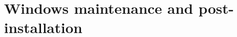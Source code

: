 \documentclass{article}
\begin{document}
\begin{comment}
  \ifnum \Status=1
      \texttt{[image: pictures/review-settings]}\hfill%
      \texttt{[image: pictures/file-copy]}
  \else
    \ifnum \Status=2
          \texttt{[image: pictures/review-settings.jpg]}\hfill%
          \texttt{[image: pictures/file-copy.jpg]}
    \else
          \texttt{[image: pictures/review-settings]}\hfill%
          \texttt{[image: pictures/file-copy]}%
    \fi
  \fi
 \end{center}
 \caption{Review Page / File Copy Page}
 \label{graph:review}\label{graph:file-copy}
\end{figure*}
\item[Final Page] The installation being over, you may want to display
  the Windows specific documentation (HTML format) and / or the log
  file of the setup process  (Figure~\ref{graph:final}
  \ifnum \Status = 1
  on the right%
  \else\ifnum \Status=2
  at the bottom%
  \else
  on the right%
  \fi\fi
  ). If it is needed (Win9x/WinME), you will
  be asked to reboot your computer.
\end{description}

\begin{figure*}[!htb]
  \textbf{Configuration Page}\hfill%
  \textbf{Final Page}
  \begin{center}
  \ifnum \Status=1
      \texttt{[image: pictures/configuration]}\hfill%
      \texttt{[image: pictures/congratulations]}
  \else
    \ifnum \Status=2
          \texttt{[image: pictures/configuration.jpg]}\hfill%
          \texttt{[image: pictures/congratulations.jpg]}
    \else
          \texttt{[image: pictures/configuration]}\hfill%
          \texttt{[image: pictures/congratulations]}%
    \fi
  \fi
 \end{center}
 \caption{Configuration Page / Final page}
\label{graph:configuration}\label{graph:final}
\end{figure*}

Please be aware that the choice of cluster size on DOS disk
partitions can radically affect the size of your \TeX\
installation. The support tree has hundreds of small files, and it is
not unusual for a complete installation to take up to four times the
amount of space used on the \CD.

\end{comment}


\section{Windows maintenance and post-installation}
\end{document}
